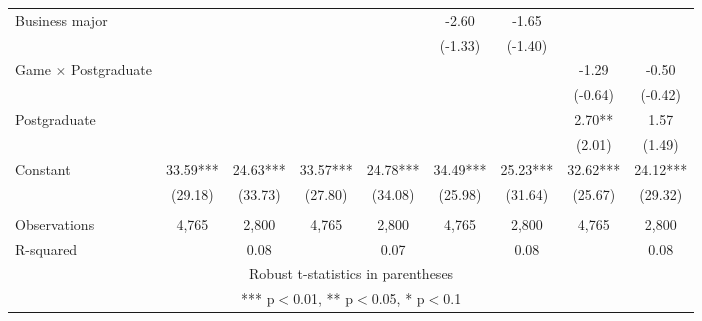 \documentclass[]{article}
\begin{document}
\begin{tabular}{lcccccccc}
Business major &  &  &  &  & -2.60 & -1.65 &  &  \\
 &  &  &  &  & (-1.33) & (-1.40) &  &  \\
Game $\times$ Postgraduate &  &  &  &  &  &  & -1.29 & -0.50 \\
 &  &  &  &  &  &  & (-0.64) & (-0.42) \\
Postgraduate &  &  &  &  &  &  & 2.70** & 1.57 \\
 &  &  &  &  &  &  & (2.01) & (1.49) \\
Constant & 33.59*** & 24.63*** & 33.57*** & 24.78*** & 34.49*** & 25.23*** & 32.62*** & 24.12*** \\
 & (29.18) & (33.73) & (27.80) & (34.08) & (25.98) & (31.64) & (25.67) & (29.32) \\
 &  &  &  &  &  &  &  &  \\
Observations & 4,765 & 2,800 & 4,765 & 2,800 & 4,765 & 2,800 & 4,765 & 2,800 \\
 R-squared &  & 0.08 &  & 0.07 &  & 0.08 &  & 0.08 \\ \hline
\multicolumn{9}{c}{ Robust t-statistics in parentheses} \\
\multicolumn{9}{c}{ *** p$<$0.01, ** p$<$0.05, * p$<$0.1} \\
\end{tabular}
\end{document}
